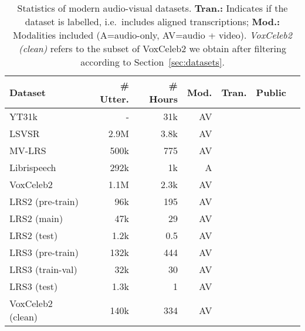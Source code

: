 \documentclass{article}
\newcommand{\cmark}{\ding{51}}\newcommand{\xmark}{\ding{55}}
\begin{document}
\begin{table}[t] 
\caption{ 
Statistics of modern audio-visual datasets.
{\bf Tran.:} Indicates if the dataset is labelled, i.e.\ includes aligned transcriptions; 
{\bf Mod.:} Modalities included (A=audio-only, AV=audio + video).
{\it VoxCeleb2 (clean)} refers to the subset of VoxCeleb2 we obtain after filtering according to Section~\ref{sec:datasets}.  
 }
\vspace{-8pt}
\setlength{\tabcolsep}{2.5pt}
\vspace{-10pt}                              
\begin{center}
\small
\begin{tabular}{ l r r r c c c } 
 \toprule
 {\bf Dataset}                        & {\bf\# Utter.} & {\bf\# Hours}  & {\bf Mod.} & {\bf Tran.} & {\bf Public} \\ 
 \midrule                                             
 YT31k \cite{makino2019recurrent}&      -    &  31k        & AV & \cmark & \xmark   \\  
 LSVSR \cite{Shillingford18}    &   2.9M    &  3.8k      & AV & \cmark & \xmark   \\  
 MV-LRS \cite{Chung16}          &   500k    &  775        & AV & \cmark & \xmark   \\  
 \midrule                                             
 Librispeech \cite{panayotov2015librispeech} &   292k    &  1k      & A  & \cmark & \cmark   \\  
 VoxCeleb2  \cite{Chung18a}     &   1.1M    &   2.3k            & AV & \xmark & \cmark   \\  
 \midrule                                             
LRS2 (pre-train) \cite{Chung17}           &   96k    &  195         & AV & \cmark & \cmark   \\  
 LRS2 (main) \cite{Chung17}                &   47k    &  29          & AV & \cmark & \cmark   \\  
 LRS2 (test) \cite{Chung17}                &   1.2k   &  0.5         & AV & \cmark & \cmark   \\  
 \midrule                                             
 LRS3 (pre-train) \cite{Afouras18d}        &   132k   &  444         & AV & \cmark & \cmark   \\  
 LRS3 (train-val) \cite{Afouras18d}        &   32k    &  30          & AV & \cmark & \cmark   \\  
 LRS3 (test) \cite{Afouras18d}             &   1.3k   &   1          & AV & \cmark & \cmark   \\  
 \midrule                                             
 VoxCeleb2 (clean)              &   140k    &   334         & AV & \xmark & \cmark   \\  
 \bottomrule

\end{tabular}             
\end{center}
\label{tab:datasets}
\normalsize
\vspace{-28pt}
\end{table}
\end{document}
